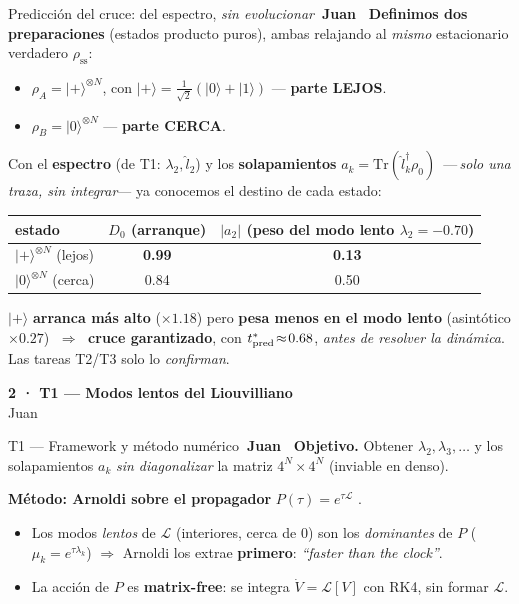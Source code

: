 \documentclass[aspectratio=169,10pt]{beamer}
\newcommand{\J}{\hfill\colorbox{juan}{\color{white}\scriptsize\bfseries~Juan~}}
\newcommand{\cs}[1]{\textcolor{seb}{\textbf{#1}}}
\newcommand{\rss}{\rho_{\mathrm{ss}}}
\newcommand{\Lop}{\mathcal{L}}
\newcommand{\ket}[1]{\lvert #1\rangle}
\newcommand{\divider}[3]{%
  \begingroup
  \setbeamercolor{background canvas}{bg=#1}
  \begin{frame}[plain]
    \vfill\begin{center}
      {\color{white}\Large\bfseries #3}\\[4pt]{\color{white!85}\small #2}
    \end{center}\vfill
  \end{frame}
  \endgroup}
\begin{document}
\begin{frame}{Predicción del cruce: del espectro, \emph{sin evolucionar}\J}
  \small
  \textbf{Definimos dos preparaciones} (estados producto puros), ambas relajando al
  \emph{mismo} estacionario verdadero $\rss$:
  \begin{itemize}\small
    \item $\rho_A=\ket{+}^{\otimes N}$, con $\ket{+}=\tfrac{1}{\sqrt2}(\ket0+\ket1)$ \;---\; \cs{parte LEJOS}.
    \item $\rho_B=\ket{0}^{\otimes N}$ \;---\; \cs{parte CERCA}.
  \end{itemize}
  \smallskip
  Con el \textbf{espectro} (de T1: $\lambda_2,\hat l_2$) y los \textbf{solapamientos}
  $a_k=\mathrm{Tr}(\hat l_k^\dagger\rho_0)$ \,---\,\emph{solo una traza, sin integrar}---
  ya conocemos el destino de cada estado:
  \begin{center}\renewcommand{\arraystretch}{1.05}
  \begin{tabular}{lcc}
  \toprule
  estado & $D_0$ (arranque) & $|a_2|$ \;(peso del modo lento $\lambda_2{=}{-}0.70$) \\
  \midrule
  $\ket{+}^{\otimes N}$ (lejos) & \textbf{0.99} & \textbf{0.13} \\
  $\ket{0}^{\otimes N}$ (cerca) & 0.84 & 0.50 \\
  \bottomrule
  \end{tabular}\end{center}
  \smallskip
  \begin{center}\colorbox{seb!12}{\parbox{0.93\textwidth}{\centering\small
  $\ket{+}$ \textbf{arranca más alto} ($\times1.18$) pero \textbf{pesa menos en el modo
  lento} (asintótico $\times0.27$) $\;\Rightarrow\;$
  \cs{cruce garantizado}, con $t^*_{\rm pred}\!\approx\!0.68$, \emph{antes de resolver
  la dinámica}. Las tareas T2/T3 solo lo \emph{confirman}.}}\end{center}
\end{frame}

\divider{juan}{Juan}{2 · T1 — Modos lentos del Liouvilliano}

\begin{frame}{T1 — Framework y método numérico\J}
  \small
  \textbf{Objetivo.} Obtener $\lambda_2,\lambda_3,\dots$ y los solapamientos $a_k$
  \emph{sin diagonalizar} la matriz $4^N\times4^N$ (inviable en denso).
  \medskip

  \textbf{Método: Arnoldi sobre el propagador} $P(\tau)=e^{\tau\Lop}$
  \cite{Minganti2018,Lehoucq1998,Balay2023}.
  \begin{itemize}
    \item Los modos \emph{lentos} de $\Lop$ (interiores, cerca de 0) son los
      \emph{dominantes} de $P$ ($\mu_k=e^{\tau\lambda_k}$) $\Rightarrow$ Arnoldi los
      extrae \textbf{primero}: \emph{``faster than the clock''}.
    \item La acción de $P$ es \cs{matrix-free}: se integra $\dot V=\Lop[V]$ con RK4,
      sin formar $\Lop$.
  \end{itemize}
\end{frame}
\end{document}
